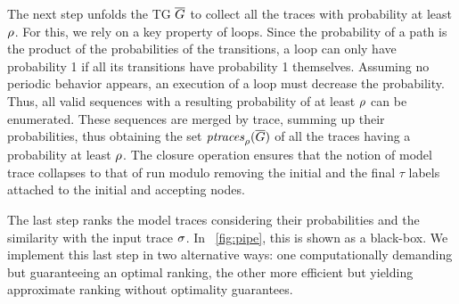 The next step unfolds the TG $\overline{G}$ to collect all the traces with probability at least $\rho$. For this, we rely on a key
property of loops. Since the probability of a path is the product of the probabilities of the transitions, a loop can only have
probability 1 if all its transitions have probability 1 themselves. Assuming no periodic behavior appears, an execution of a
loop must decrease the probability. Thus, all valid sequences with a resulting probability of at least $\rho$ can be enumerated.
These sequences are merged by trace, summing up their probabilities, thus obtaining the set $\mathit{ptraces}_{\rho}(\overline{G})$
of all the traces having a probability at least $\rho$. The closure operation ensures that the notion of model trace collapses to
that of run modulo removing the initial and the final $\tau$ labels attached to the initial and accepting nodes.

The last step ranks the model traces considering their probabilities and the similarity with the input trace $\sigma$. In
\figurename~\ref{fig:pipe}, this is shown as a black-box. We implement this last step in two alternative ways: one
computationally demanding but guaranteeing an optimal ranking, the other more efficient but yielding approximate ranking without
optimality guarantees.

\endinput


%
We can show that the TG obtained in Definition \ref{def:transf} preserves the same set of probabilistic traces associated by the reachability graph. The proof is omitted due to the lack of space.

\begin{example}
\figurename~\ref{fig:lmc} shows the TG obtained from the reachability graph in \figurename~\ref{fig:rg}. Nodes are labeled with the firing
transition labels (in green), and edges preserve the probabilistic information from the reachability graph (in red). Intuitively, when a
new initial node \textit{\textbf{i}} is inserted, we preserve all the initial probabilistic choices that a transition is fired from an initial
marking $M$, while the intermediate edges inherit the probabilistic choice of the firing transition from the subsequent choices. When
a new final node \textit{\textbf{f}} is added, such edges always have probability $1$, and thus do not interfere with the
initial traces' probability.
\end{example}


